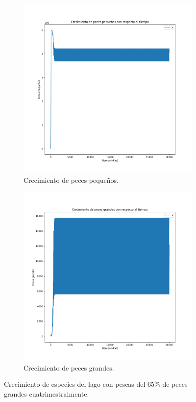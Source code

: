 \documentclass[11pt,a4paper]{report}
\begin{document}
\begin{figure}[H]
  \begin{subfigure}[b]{0.49\textwidth}
    \includegraphics[width=\textwidth, height=\textwidth]{img/Cap-3/apartado-3/pequenyos_periodo_91.png}
    \caption{Crecimiento de peces pequeños.}
    \label{fig:f1}
  \end{subfigure}
  \hfill
  \begin{subfigure}[b]{0.49\textwidth}
    \includegraphics[width=\textwidth, height=\textwidth]{img/Cap-3/apartado-3/grandes_periodo_91.png}
    \caption{Crecimiento de peces grandes.}
    \label{fig:f2}
  \end{subfigure}
  \caption{Crecimiento de especies del lago con pescas del 65\% de peces grandes cuatrimestralmente.}
\end{figure}
\end{document}

